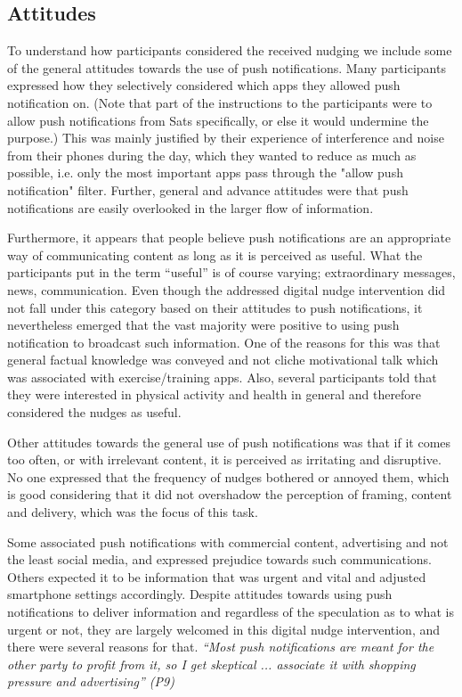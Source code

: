 \subsection{Attitudes}
To understand how participants considered the received nudging we include some of the general attitudes towards the use of push notifications. Many participants expressed how they selectively considered which apps they allowed push notification on. (Note that part of the instructions to the participants were to allow push notifications from Sats specifically, or else it would undermine the purpose.) This was mainly justified by their experience of interference and noise from their phones during the day, which they wanted to reduce as much as possible, i.e. only the most important apps pass through the "allow push notification" filter. Further, general and advance attitudes were that push notifications are easily overlooked in the larger flow of information. 

Furthermore, it appears that people believe push notifications are an appropriate way of communicating content as long as it is perceived as useful. What the participants put in the term “useful” is of course varying; extraordinary messages, news, communication. Even though the addressed digital nudge intervention did not fall under this category based on their attitudes to push notifications, it nevertheless emerged that the vast majority were positive to using push notification to broadcast such information. One of the reasons for this was that general factual knowledge was conveyed and not cliche motivational talk which was associated with exercise/training apps. Also, several participants told that they were interested in physical activity and health in general and therefore considered the nudges as useful. 

Other attitudes towards the general use of push notifications was that if it comes too often, or with irrelevant content, it is perceived as irritating and disruptive. No one expressed that the frequency of nudges bothered or annoyed them, which is good considering that it did not overshadow the perception of framing, content and delivery, which was the focus of this task.

Some associated push notifications with commercial content, advertising and not the least social media, and expressed prejudice towards such communications. Others expected it to be information that was urgent and vital and adjusted smartphone settings accordingly. Despite attitudes towards using push notifications to deliver information and regardless of the speculation as to what is urgent or not, they are largely welcomed in this digital nudge intervention, and there were several reasons for that. \textit{“Most push notifications are meant for the other party to profit from it, so I get	skeptical ... associate it with shopping pressure and advertising” (P9)}

